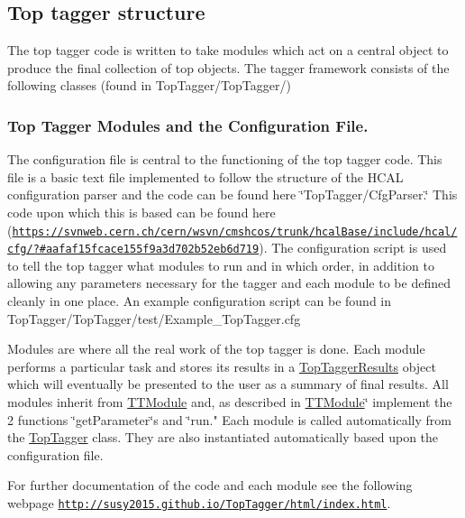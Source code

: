 \subsection*{Top tagger structure}

The top tagger code is written to take modules which act on a central object to produce the final collection of top objects. The tagger framework consists of the following classes (found in Top\-Tagger/\-Top\-Tagger/)

\subsubsection*{Top Tagger Modules and the Configuration File.}

The configuration file is central to the functioning of the top tagger code. This file is a basic text file implemented to follow the structure of the H\-C\-A\-L configuration parser and the code can be found here \char`\"{}\-Top\-Tagger/\-Cfg\-Parser.\char`\"{} This code upon which this is based can be found here (\href{https://svnweb.cern.ch/cern/wsvn/cmshcos/trunk/hcalBase/include/hcal/cfg/?#aafaf15fcace155f9a3d702b52eb6d719}{\tt https\-://svnweb.\-cern.\-ch/cern/wsvn/cmshcos/trunk/hcal\-Base/include/hcal/cfg/?\#aafaf15fcace155f9a3d702b52eb6d719}). The configuration script is used to tell the top tagger what modules to run and in which order, in addition to allowing any parameters necessary for the tagger and each module to be defined cleanly in one place. An example configuration script can be found in Top\-Tagger/\-Top\-Tagger/test/\-Example\-\_\-\-Top\-Tagger.\-cfg

Modules are where all the real work of the top tagger is done. Each module performs a particular task and stores its results in a \hyperlink{classTopTaggerResults}{Top\-Tagger\-Results} object which will eventually be presented to the user as a summary of final results. All modules inherit from \hyperlink{classTTModule}{T\-T\-Module} and, as described in \hyperlink{classTTModule}{T\-T\-Module}\char`\"{} implement the 2 functions \char`\"{}get\-Parameter\char`\"{}s and \char`\"{}run." Each module is called automatically from the \hyperlink{classTopTagger}{Top\-Tagger} class. They are also instantiated automatically based upon the configuration file.

For further documentation of the code and each module see the following webpage \href{http://susy2015.github.io/TopTagger/html/index.html}{\tt http\-://susy2015.\-github.\-io/\-Top\-Tagger/html/index.\-html}.

